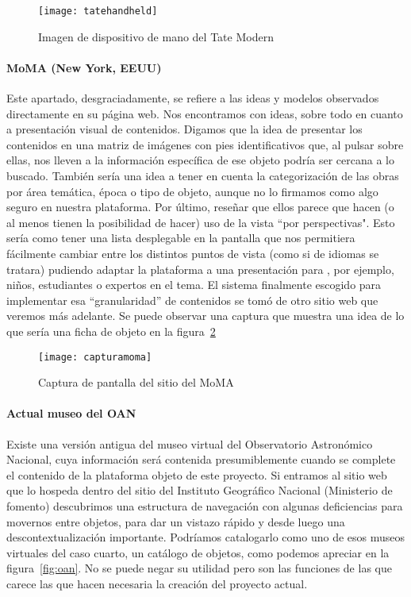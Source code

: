 \begin{figure}
\centering
\texttt{[image: tatehandheld]}
\caption{Imagen de dispositivo de mano del Tate Modern\cite{references:tatehandheld}}
\label{fig:tatehandheld}
\end{figure}



\paragraph{MoMA (New York, EEUU)}
\par Este apartado, desgraciadamente, se refiere a las ideas y modelos observados directamente en su página web. Nos encontramos con ideas, sobre todo en cuanto a presentación visual de contenidos. Digamos que la idea de presentar los contenidos en una matriz de imágenes con pies identificativos que, al pulsar sobre ellas, nos lleven a la información específica de ese objeto podría ser cercana a lo buscado. También sería una idea a tener en cuenta la categorización de las obras por área temática, época o tipo de objeto, aunque no lo firmamos como algo seguro en nuestra plataforma. Por último, reseñar que ellos parece que hacen (o al menos tienen la posibilidad de hacer) uso de la vista ``por perspectivas". Esto sería como tener una lista desplegable en la pantalla que nos permitiera fácilmente cambiar entre los distintos puntos de vista (como si de idiomas se tratara) pudiendo adaptar la plataforma a una presentación para , por ejemplo, niños, estudiantes o expertos en el tema. El sistema finalmente escogido para implementar esa ``granularidad'' de contenidos se tomó de otro sitio web que veremos más adelante. Se puede observar una captura que muestra una idea de lo que sería una ficha de objeto en la figura~\ref{fig:moma}

\begin{figure}
\begin{narrow}{-0.1\linewidth}{-0.1\linewidth}
\centering
\texttt{[image: capturamoma]}
\caption{Captura de pantalla del sitio del MoMA}
\label{fig:moma}
\end{narrow}
\end{figure}



\paragraph{Actual museo del OAN}
\par Existe una versión antigua del museo virtual del Observatorio Astronómico Nacional, cuya información será contenida presumiblemente cuando se complete el contenido de la plataforma objeto de este proyecto. Si entramos al sitio web que lo hospeda dentro del sitio del Instituto Geográfico Nacional (Ministerio de fomento) descubrimos una estructura de navegación con algunas deficiencias para movernos entre objetos, para dar un vistazo rápido y desde luego una descontextualización importante. Podríamos catalogarlo como uno de esos museos virtuales del caso cuarto, un catálogo de objetos, como podemos apreciar en la figura~\ref{fig:oan}. No se puede negar su utilidad pero son las funciones de las que carece las que hacen necesaria la creación del proyecto actual.

